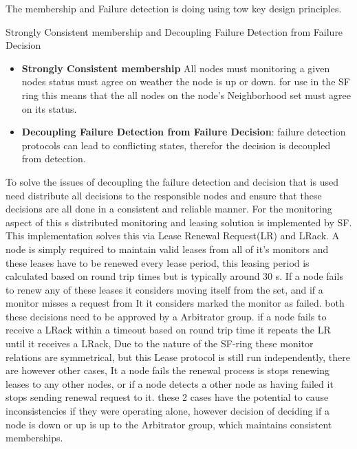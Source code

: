 \documentclass[a4paper,10pt,titlepage]{report}
\begin{document}
    The membership and Failure detection is doing using tow key design principles.\\
    \vspace{5mm}

    Strongly Consistent membership and Decoupling Failure Detection from Failure Decision\\
    \vspace{5mm}

    \begin{itemize}
        \item \textbf{Strongly Consistent membership} All nodes must monitoring a given nodes status must agree on weather the node is up or down. for use in the SF ring this means that the all nodes on the node's Neighborhood set must agree on its status.
        \item \textbf{Decoupling Failure Detection from Failure Decision}: failure detection protocols can lead to conflicting states, therefor the decision is decoupled from detection.
    \end{itemize}
    \vspace{5mm}

    To solve the issues of decoupling the failure detection and decision that is used need distribute all decisions to the responsible nodes and ensure that these decisions are all done in a consistent and reliable manner. For the monitoring aspect of this s distributed monitoring and leasing solution is implemented by SF. This implementation solves this via Lease Renewal Request(LR) and LRack. A node is simply required to maintain valid leases from all of it's monitors and these leases have to be renewed every lease period, this leasing period is calculated based on round trip times but is typically around 30 s. If a node fails to renew any of these leases it considers moving itself from the set, and if a monitor misses a request from It it considers marked the monitor as failed. both these decisions need to be approved by a Arbitrator group. if a node fails to receive a LRack within a timeout based on round trip time it repeats the LR until it receives a LRack, Due to the nature of the SF-ring these monitor relations are symmetrical, but this Lease protocol is still run independently, there are however other cases, It a node fails the renewal process is stops renewing leases to any other nodes, or if a node detects a other node as having failed it stops sending renewal request to it. these 2 cases have the potential to cause inconsistencies if they were operating alone, however decision of deciding if a node is down or up is up to the Arbitrator group, which maintains consistent memberships. \\
    \vspace{5mm}
\end{document}
